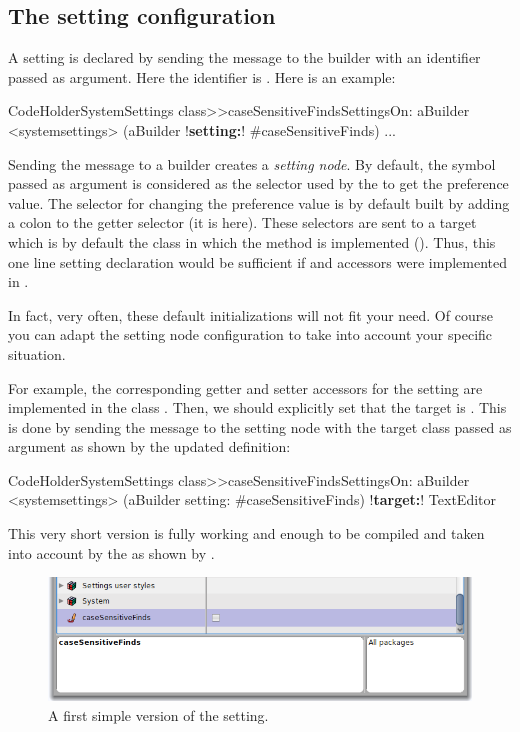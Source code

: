 \documentclass[a4paper,10pt,twoside]{book}
\begin{document}
\subsection{The setting configuration}
A setting is declared by sending the message  to the builder with an identifier passed as argument. Here the identifier is . Here is an example: 
\begin{code}{}
CodeHolderSystemSettings class>>caseSensitiveFindsSettingsOn: aBuilder
	<systemsettings>
	(aBuilder !\textbf{setting:}! #caseSensitiveFinds) 
    ...
\end{code}



Sending the message  to a builder creates a \textit{setting node}.
By default, the symbol passed as argument is considered as the selector used by the \setbrowser to get the preference value. The selector for changing the preference value is by default built by adding a colon to the getter selector (\ie it is  here).
These selectors are sent to a target which is by default the class in which the method is implemented (\ie {}). Thus, this one line setting declaration would be sufficient if   and  accessors were implemented in . 

In fact, very often, these default initializations will not fit your need. Of course you can adapt the setting node configuration to take into account your specific situation. 

For example,  the corresponding getter and setter accessors for the  setting are implemented in the class . Then, we should explicitly set that the target is . This is done by sending the message  to the setting node with the target class  passed as argument as shown by the updated definition: 
\begin{code}{}
CodeHolderSystemSettings class>>caseSensitiveFindsSettingsOn: aBuilder
	<systemsettings>
	(aBuilder setting: #caseSensitiveFinds) 
		 !\textbf{target:}! TextEditor
\end{code}

This very short version is fully working and enough to be compiled and taken into account by the \setbrowser as shown by .

\begin{figure}[tbh]
\begin{center}
\includegraphics[scale=0.4]{caseSensitiveFinds_setting_declaration2}
\caption{A first simple version of the  setting.}
\end{center}
\end{figure}
\end{document}

